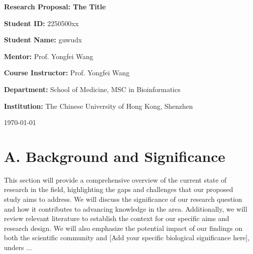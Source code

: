 \documentclass[12pt, a4paper]{article}
\begin{document}
\begin{titlepage}
    \centering
    \vspace*{2cm}

    {\LARGE \bfseries Research Proposal: The Title\par}
    
    \vspace{3cm}
    
    {\Large \textbf{Student ID:} 2250500xx\par}
    \vspace{0.5cm}
    {\Large \textbf{Student Name:} guwudx\par}
    \vspace{0.5cm}
    {\Large \textbf{Mentor:} Prof. Yongfei Wang\par} 
    \vspace{0.5cm}
    {\Large \textbf{Course Instructor:} Prof. Yongfei Wang\par} 
    \vspace{0.5cm}
    {\Large \textbf{Department:} School of Medicine, MSC in Bioinformatics\par}
    \vspace{0.5cm}
    {\Large \textbf{Institution:} The Chinese University of Hong Kong, Shenzhen\par}
    
    \vfill
    
    {\large \today\par}
\end{titlepage}

\newpage

\section*{A. Background and Significance}

This section will provide a comprehensive overview of the current state of research in the field, highlighting the gaps and challenges that our proposed study aims to address. We will discuss the significance of our research question and how it contributes to advancing knowledge in the area. Additionally, we will review relevant literature to establish the context for our specific aims and research design. We will also emphasize the potential impact of our findings on both the scientific community and [Add your specific biological significance here], unders ...
\end{document}
